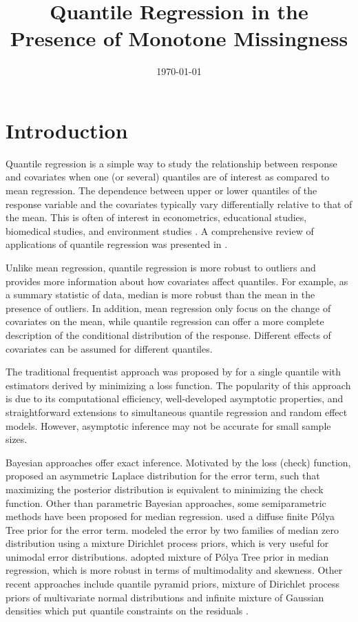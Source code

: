 \documentclass[12pt]{article}
\title{Quantile Regression in the Presence of Monotone Missingness}
\date{\today}
\author{}
\newcommand{\polya}{P\'{o}lya}
\begin{document}
\maketitle

\begin{abstract}
\end{abstract}

\section{Introduction}

Quantile regression is a simple way to study the relationship between
response and covariates when one (or several) quantiles are of
interest as compared to mean regression.  The dependence between upper
or lower quantiles of the response variable and the covariates
typically vary differentially relative to that of the mean. This is
often of interest in econometrics, educational studies, biomedical
studies, and environment studies \citep{yu2001,
buchinsky1994,buchinsky1998,he1998,
koenker1999,wei2006,yu2003}. A comprehensive
review of applications of quantile regression was presented in
\citep{koenker2005}.

Unlike mean regression, quantile regression is more robust to outliers
and provides more information about how covariates affect
quantiles. For example, as a summary statistic of data, median is more
robust than the mean in the presence of outliers.  In addition, mean
regression only focus on the change of covariates on the mean, while
quantile regression can offer a more complete description of the
conditional distribution of the response. Different effects of
covariates can be assumed for different quantiles.

The traditional frequentist approach was proposed by
\citep{koenker1978} for a single quantile with estimators derived by
minimizing a loss function. The popularity of this approach is due to
its computational efficiency, well-developed asymptotic properties,
and straightforward extensions to simultaneous quantile regression and
random effect models. However, asymptotic inference may not be
accurate for small sample sizes.

Bayesian approaches offer exact inference. Motivated by the loss
(check) function, \citep{yu2001} proposed an asymmetric Laplace
distribution for the error term, such that maximizing the posterior
distribution is equivalent to minimizing the check function. Other
than parametric Bayesian approaches, some semiparametric methods have
been proposed for median regression. \citep{walker1999} used a diffuse
finite \polya{} Tree prior for the error term. \citep{kottas2001}
modeled the error by two families of median zero distribution using a
mixture Dirichlet process priors, which is very useful for unimodal
error distributions. \citep{hanson2002} adopted mixture of \polya{}
Tree prior in median regression, which is more robust in terms of
multimodality and skewness. Other recent approaches include quantile
pyramid priors, mixture of Dirichlet process priors of multivariate
normal distributions and infinite mixture of Gaussian densities which
put quantile constraints on the residuals \citep{hjort2007,
hjort2009, kottas2009,reich2010}.
\end{document}
